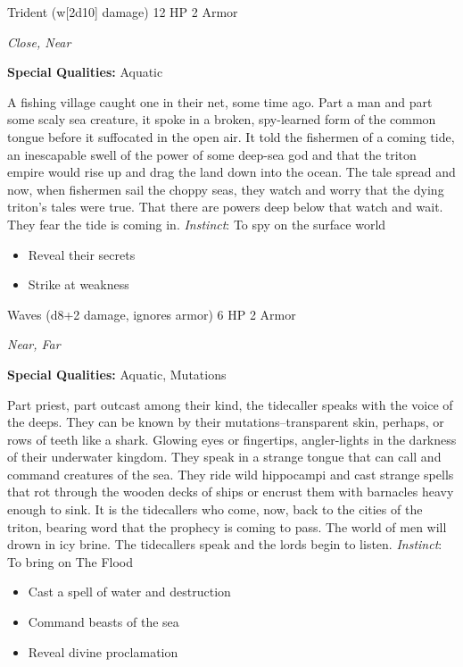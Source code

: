 Trident (w[2d10] damage)\hspace*{\fill} 12 HP 2 Armor

\emph{Close, Near}

\textbf{Special Qualities:}
Aquatic

\HRule
A fishing village caught one in their net, some time ago. Part a man and part some scaly sea creature, it spoke in a broken, spy-learned form of the common tongue before it suffocated in the open air. It told the fishermen of a coming tide, an inescapable swell of the power of some deep-sea god and that the triton empire would rise up and drag the land down into the ocean. The tale spread and now, when fishermen sail the choppy seas, they watch and worry that the dying triton's tales were true. That there are powers deep below that watch and wait. They fear the tide is coming in. \emph{Instinct}: To spy on the surface world
\begin{itemize}
\item Reveal their secrets
\item Strike at weakness
\end{itemize}

\HRule
{}

Waves (d8+2 damage, ignores armor)\hspace*{\fill} 6 HP 2 Armor

\emph{Near, Far}

\textbf{Special Qualities:}
Aquatic, Mutations

\HRule
Part priest, part outcast among their kind, the tidecaller speaks with the voice of the deeps. They can be known by their mutations--transparent skin, perhaps, or rows of teeth like a shark. Glowing eyes or fingertips, angler-lights in the darkness of their underwater kingdom. They speak in a strange tongue that can call and command creatures of the sea. They ride wild hippocampi and cast strange spells that rot through the wooden decks of ships or encrust them with barnacles heavy enough to sink. It is the tidecallers who come, now, back to the cities of the triton, bearing word that the prophecy is coming to pass. The world of men will drown in icy brine. The tidecallers speak and the lords begin to listen. \emph{Instinct}: To bring on The Flood
\begin{itemize}
\item Cast a spell of water and destruction
\item Command beasts of the sea
\item Reveal divine proclamation
\end{itemize}
\newpage
\HRule
{}

